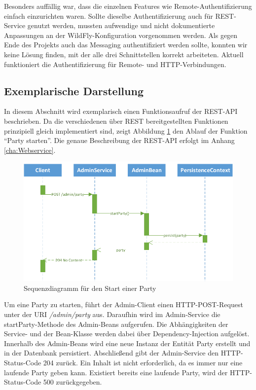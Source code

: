 Besonders auffällig war, dass die einzelnen Features wie Remote-Authentifizierung einfach einzurichten waren. Sollte dieselbe Authentifizierung auch für REST-Service genutzt werden, mussten aufwendige und nicht dokumentierte Anpassungen an der WildFly-Konfiguration vorgenommen werden. Als gegen Ende des Projekts auch das Messaging authentifiziert werden sollte, konnten wir keine Lösung finden, mit der alle drei Schnittstellen korrekt arbeiteten. Aktuell funktioniert die Authentifizierung für Remote- und HTTP-Verbindungen. 


\subsection{Exemplarische Darstellung}
In diesem Abschnitt wird exemplarisch einen Funktionsaufruf der REST-API beschrieben. Da die verschiedenen über REST bereitgestellten Funktionen prinzipiell gleich implementiert sind, zeigt Abbildung \ref{fig:AufrufSequenz} den Ablauf der Funktion "`Party starten"'. Die genaue Beschreibung der REST-API erfolgt im Anhang \ref{cha:Webservice}.

\begin{figure}[tbh]
\centering
\includegraphics[width=1.0\linewidth]{Bilder/AufrufSequenz}
\caption{Sequenzdiagramm für den Start einer Party}
\label{fig:AufrufSequenz}
\end{figure}

Um eine Party zu starten, führt der Admin-Client einen HTTP-POST-Request unter der URI \textit{/admin/party} aus. Daraufhin wird im Admin-Service die startParty-Methode des Admin-Beans aufgerufen. Die Abhängigkeiten der Service- und der Bean-Klasse werden dabei über Dependency-Injection aufgelöst. Innerhalb des Admin-Beans wird eine neue Instanz der Entität Party erstellt und in der Datenbank persistiert. Abschließend gibt der Admin-Service den HTTP-Status-Code 204 zurück. Ein Inhalt ist nicht erforderlich, da es immer nur eine laufende Party geben kann. Existiert bereits eine laufende Party, wird der HTTP-Status-Code 500 zurückgegeben.


